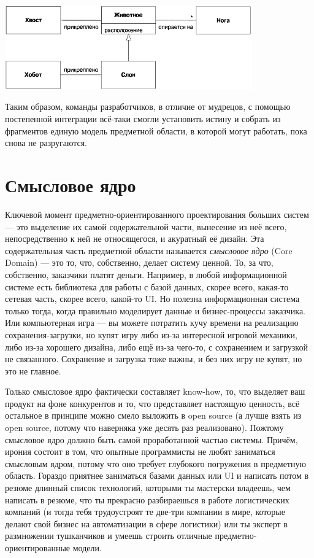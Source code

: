 \documentclass{../../text-style}
\begin{document}
\begin{center}
    \includegraphics[width=0.8\textwidth]{elephantSingleBoundedContext.png}
\end{center}

Таким образом, команды разработчиков, в отличие от мудрецов, с помощью постепенной интеграции всё-таки смогли установить истину и собрать из фрагментов единую модель предметной области, в которой могут работать, пока снова не разругаются.

\section{Смысловое ядро}

Ключевой момент предметно-ориентированного проектирования больших систем --- это выделение их самой содержательной части, вынесение из неё всего, непосредственно к ней не относящегося, и акуратный её дизайн. Эта содержательная часть предметной области называется \textit{смысловое ядро} (Core Domain) --- это то, что, собственно, делает систему ценной. То, за что, собственно, заказчики платят деньги. Например, в любой информационной системе есть библиотека для работы с базой данных, скорее всего, какая-то сетевая часть, скорее всего, какой-то UI. Но полезна информационная система только тогда, когда правильно моделирует данные и бизнес-процессы заказчика. Или компьютерная игра --- вы можете потратить кучу времени на реализацию сохранения-загрузки, но купят игру либо из-за интересной игровой механики, либо из-за хорошего дизайна, либо ещё из-за чего-то, с сохранением и загрузкой не связанного. Сохранение и загрузка тоже важны, и без них игру не купят, но это не главное.

Только смысловое ядро фактически составляет know-how, то, что выделяет ваш продукт на фоне конкурентов и то, что представляет настоящую ценность, всё остальное в принципе можно смело выложить в open source (а лучше взять из open source, потому что наверняка уже десять раз реализовано). Пожтому смысловое ядро должно быть самой проработанной частью системы. Причём, ирония состоит в том, что опытные программисты не любят заниматься смысловым ядром, потому что оно требует глубокого погружения в предметную область. Гораздо приятнее заниматься базами данных или UI и написать потом в резюме длинный список технологий, которыми ты мастерски владеешь, чем написать в резюме, что ты прекрасно разбираешься в работе логистических компаний (и тогда тебя трудоустроят те две-три компании в мире, которые делают свой бизнес на автоматизации в сфере логистики) или ты эксперт в размножении тушканчиков и умеешь строить отличные предметно-ориентированные модели.
\end{document}
